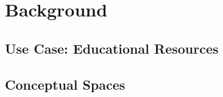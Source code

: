 \chapter{Background}


\section{Use Case: Educational Resources}


\section{Conceptual Spaces}







